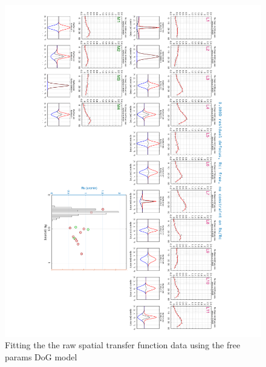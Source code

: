 \documentclass[11pt, oneside]{article}   	%
\begin{document}
\newpage

\begin{figure}[htbp] %
   \centering
   \includegraphics[width=7in]{Slide1.pdf} 
   \caption{Fitting the the raw spatial transfer function data using the free params DoG model}
   \label{fig:example}
\end{figure}
\end{document}
